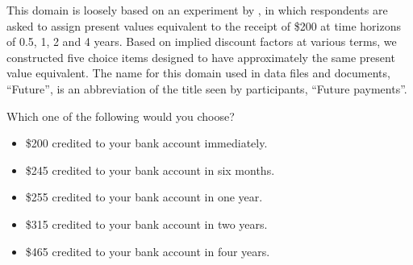 This domain is loosely based on an experiment by \citet{BenzRapoYagi89}, in which respondents are asked to assign present values equivalent to the receipt of \$200 at time horizons of 0.5, 1, 2 and 4 years.
Based on implied discount factors at various terms, we constructed five choice items designed to have approximately the same present value equivalent.
The name for this domain used in data files and documents, ``Future'', is an abbreviation of the title seen by participants, ``Future payments''.

\begin{tcolorbox}
Which one of the following would you choose?

\begin{itemize}
	\item \$200 credited to your bank account immediately.
	\item \$245 credited to your bank account in six months.
	\item \$255 credited to your bank account in one year.
	\item \$315 credited to your bank account in two years.
	\item \$465 credited to your bank account in four years.
\end{itemize}
\end{tcolorbox}
